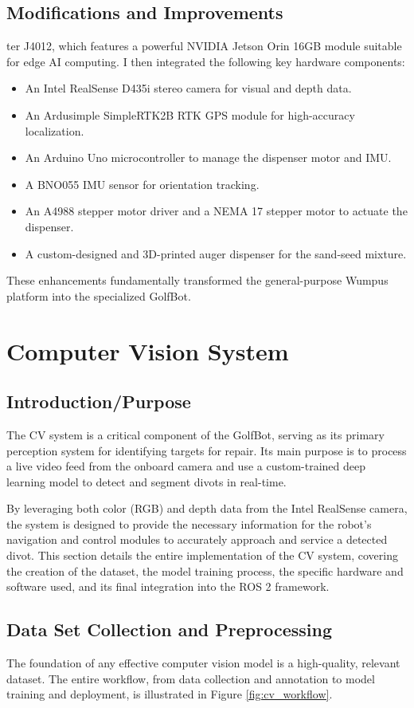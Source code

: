 \subsection{Modifications and Improvements} ter J4012, which features a powerful NVIDIA Jetson Orin 16GB module suitable for edge AI computing. I then integrated the following key hardware components:
\begin{itemize}
    \item An Intel RealSense D435i stereo camera for visual and depth data.
    \item An Ardusimple SimpleRTK2B RTK GPS module for high-accuracy localization.
    \item An Arduino Uno microcontroller to manage the dispenser motor and IMU.
    \item A BNO055 IMU sensor for orientation tracking.
    \item An A4988 stepper motor driver and a NEMA 17 stepper motor to actuate the dispenser.
    \item A custom-designed and 3D-printed auger dispenser for the sand-seed mixture.
\end{itemize}
These enhancements fundamentally transformed the general-purpose Wumpus platform into the specialized GolfBot.

\section{Computer Vision System}
\subsection{Introduction/Purpose}
\label{ssec:cv_intro}
The \gls{CV} system is a critical component of the GolfBot, serving as its primary perception system for identifying targets for repair. Its main purpose is to process a live video feed from the onboard camera and use a custom-trained deep learning model to detect and segment divots in real-time.

By leveraging both color (\gls{RGB}) and depth data from the Intel RealSense camera, the system is designed to provide the necessary information for the robot's navigation and control modules to accurately approach and service a detected divot. This section details the entire implementation of the CV system, covering the creation of the dataset, the model training process, the specific hardware and software used, and its final integration into the ROS 2 framework.

\subsection{Data Set Collection and Preprocessing}
\label{ssec:cv_dataset}
The foundation of any effective computer vision model is a high-quality, relevant dataset. The entire workflow, from data collection and annotation to model training and deployment, is illustrated in Figure \ref{fig:cv_workflow}.

